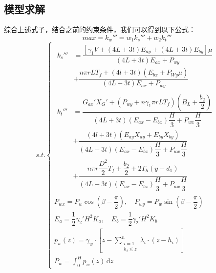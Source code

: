\documentclass[withoutpreface,bwprint]{cumcmthesis}
\begin{document}
\subsection{模型求解}
综合上述式子，结合之前的约束条件，我们可以得到以下公式：
$$max=k_w''' = w_1k_s''' + w_2k_t'''$$
\begin{equation}s.t.
    \begin{cases}
        \begin{aligned}
            k_s''' &= \dfrac{[\gamma_1 V + (4L + 3t)E_{ay} + (4L + 3t)E_{by}]\mu}{(4L + 3t)E_{ax} + P_{wy}} \\
            &+ \dfrac{n\pi r L T_f + (4l + 3t)(E_{bx}+P_{Wy}\mu)}{(4L + 3t)E_{ax} + P_{wy}}
        \end{aligned} \\[0.3cm]
        \begin{aligned}
            k_t''' &= \dfrac{G_{ax}' X_G' + (P_{wy} + n\gamma_1 \pi r L T_f) \left(B_L + \dfrac{b_2}{2}\right)}{(4L + 3t)\left(E_{ax} - E_{bx}\right)\dfrac{H}{3} + P_{wx}\dfrac{H}{3}} \\
            &+ \dfrac{(4l + 3t)\left(E_{ay}X_{ay} + E_{by}X_{by}\right)}{(4L + 3t)\left(E_{ax} - E_{bx}\right)\dfrac{H}{3} + P_{wx}\dfrac{H}{3}} \\
            &+ \dfrac{n\pi r \dfrac{D^2}{2}T_f + \dfrac{b_2}{2} + 2T_h(y + d_1)}{(4L + 3t)\left(E_{ax} - E_{bx}\right)\dfrac{H}{3} + P_{wx}\dfrac{H}{3}}
        \end{aligned} \\[0.3cm]
        P_{wx} = P_w\cos\left(\beta - \dfrac{\pi}{2}\right), \quad P_{wy} = P_w\sin\left(\beta - \dfrac{\pi}{2}\right) \\[0.2cm]
        E_a = \dfrac{1}{2} \gamma_2'H^2K_a, \quad E_b = \dfrac{1}{2} \gamma_2'H^2K_b \\[0.2cm]
        p_w(z) = \gamma_w \cdot \left[ z - \sum_{\substack{i=1 \\ h_i \leq z}}^{n} \lambda_i \cdot (z - h_i) \right] \\[0.2cm]
        P_w = \int_{0}^{H} p_w(z) \, \mathrm{d} z
    \end{cases}
\end{equation}
\end{document}
